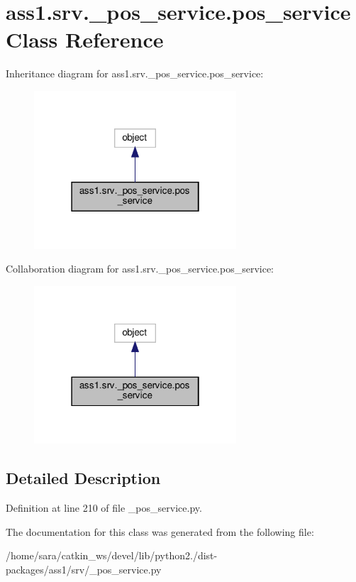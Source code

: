 \hypertarget{classass1_1_1srv_1_1__pos__service_1_1pos__service}{}\section{ass1.\+srv.\+\_\+pos\+\_\+service.\+pos\+\_\+service Class Reference}
\label{classass1_1_1srv_1_1__pos__service_1_1pos__service}


Inheritance diagram for ass1.\+srv.\+\_\+pos\+\_\+service.\+pos\+\_\+service\+:
\nopagebreak
\begin{figure}[H]
\begin{center}
\leavevmode
\includegraphics[width=214pt]{classass1_1_1srv_1_1__pos__service_1_1pos__service__inherit__graph}
\end{center}
\end{figure}


Collaboration diagram for ass1.\+srv.\+\_\+pos\+\_\+service.\+pos\+\_\+service\+:
\nopagebreak
\begin{figure}[H]
\begin{center}
\leavevmode
\includegraphics[width=214pt]{classass1_1_1srv_1_1__pos__service_1_1pos__service__coll__graph}
\end{center}
\end{figure}


\subsection{Detailed Description}


Definition at line 210 of file \+\_\+pos\+\_\+service.\+py.



The documentation for this class was generated from the following file\+:\begin{DoxyCompactItemize}
\item 
/home/sara/catkin\+\_\+ws/devel/lib/python2./dist-\/packages/ass1/srv/\+\_\+pos\+\_\+service.\+py\end{DoxyCompactItemize}

